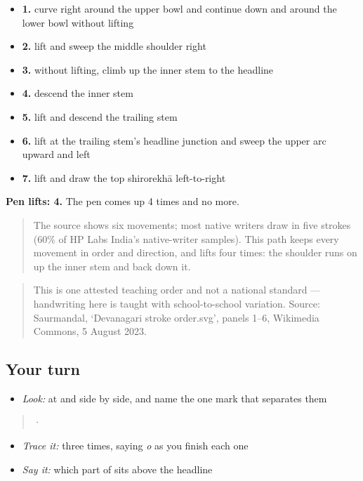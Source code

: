 \begin{itemize}
\raggedright
  \item \textbf{1.} curve right around the upper bowl and continue down and around the lower bowl without lifting
  \item \textbf{2.} lift and sweep the middle shoulder right
  \item \textbf{3.} without lifting, climb up the inner stem to the headline
  \item \textbf{4.} descend the inner stem
  \item \textbf{5.} lift and descend the trailing stem
  \item \textbf{6.} lift at the trailing stem's headline junction and sweep the upper arc upward and left
  \item \textbf{7.} lift and draw the top shirorekhā left-to-right
\end{itemize}

\textbf{Pen lifts: 4.} The pen comes up 4 times and no more.

\begin{quote}
The source shows six movements; most native writers draw  in five strokes (60\% of HP Labs India's native-writer samples). This path keeps every movement in order and direction, and lifts four times: the shoulder runs on up the inner stem and back down it.
\end{quote}

\begin{quote}
This is one attested teaching order and not a national standard — handwriting here is taught with school-to-school variation. Source: Saurmandal, ‘Devanagari  stroke order.svg’, panels 1–6, Wikimedia Commons, 5 August 2023.
\end{quote}

\subsection*{Your turn}
\begin{itemize}
\raggedright
  \item \emph{Look:} at  and  side by side, and name the one mark that separates them
\end{itemize}

\begin{quote}
  ·  
\end{quote}

\begin{itemize}
\raggedright
  \item \emph{Trace it:}  three times, saying \emph{o} as you finish each one
  \item \emph{Say it:} which part of  sits above the headline
\end{itemize}

